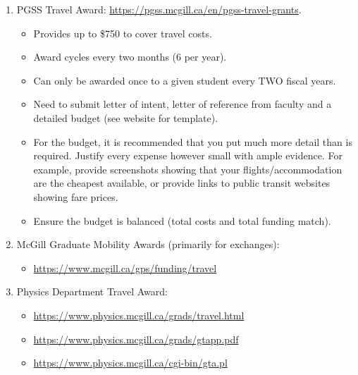     \begin{enumerate}
        \item  PGSS Travel Award: \url{https://pgss.mcgill.ca/en/pgss-travel-grants}.
    \begin{itemize}
        \item Provides up to \$750 to cover travel costs.
        \item Award cycles every two months (6 per year).
        \item Can only be awarded once to a given student every TWO fiscal years.
        \item Need to submit letter of intent, letter of reference from faculty and a detailed budget (see website for template).
        \item For the budget, it is recommended that you put much more detail than is required. Justify every expense however small with ample evidence. For example, provide screenshots showing that your flights/accommodation are the cheapest available, or provide links to public transit websites showing fare prices.
        \item Ensure the budget is balanced (total costs and total funding match).\\
    \end{itemize}

    \item  McGill Graduate Mobility Awards (primarily for exchanges): 
    \begin{itemize}
    \item \url{https://www.mcgill.ca/gps/funding/travel}\\
    \end{itemize}

    \item  Physics Department Travel Award:
    \begin{itemize}
    \item \url{https://www.physics.mcgill.ca/grads/travel.html}
    \item \url{https://www.physics.mcgill.ca/grads/gtapp.pdf}
    \item \url{https://www.physics.mcgill.ca/cgi-bin/gta.pl}\\
    \end{itemize}
    
    \end{enumerate}
        
   
